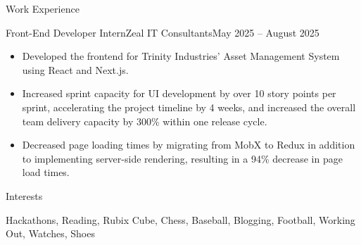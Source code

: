 \documentclass[]{mcdowellcv}
\begin{document}
		\begin{cvsection}{Work Experience}
		\begin{cvsubsection}{Front-End Developer Intern}{Zeal IT Consultants}{May 2025 -- August 2025}			
			\begin{itemize}
				\item Developed the frontend for Trinity Industries' Asset Management System using React and Next.js.
				\smallskip
				\item Increased sprint capacity for UI development by over 10 story points per sprint, accelerating the project timeline by 4 weeks, and increased the overall team delivery capacity by 300\% within one release cycle.
				\smallskip
				\item Decreased page loading times by migrating from MobX to Redux in addition to implementing server-side rendering, resulting in a 94\% decrease in page load times.
			\end{itemize}
		\end{cvsubsection}
	\end{cvsection}

	\begin{cvsection}{Interests}
		\begin{cvsubsection}{}{}{}
			\medskip
				Hackathons, Reading, Rubix Cube, Chess, Baseball, Blogging, Football, Working Out, Watches, Shoes
		\end{cvsubsection}
	\end{cvsection}

	
\end{document}
